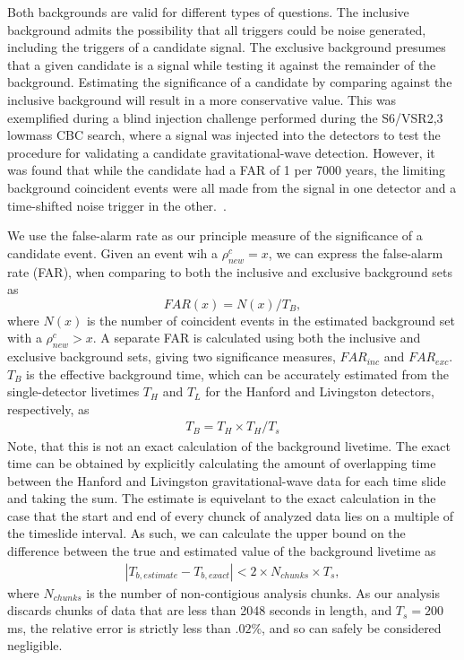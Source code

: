 Both backgrounds are valid for different types of questions. The inclusive background admits the possibility that all triggers could be noise generated, including the triggers of a candidate signal. The exclusive background presumes that a given candidate is a signal while testing it against the remainder of the background. Estimating the significance of a candidate by comparing against the inclusive background will result in a more conservative value. This was exemplified during a blind injection challenge performed during the S6/VSR2,3 lowmass CBC search, where a signal was injected into the detectors to test the procedure for validating a candidate gravitational-wave detection. However, it was found that while the candidate had a FAR of 1 per 7000 years, the limiting background coincident events were all made from the signal in one detector and a time-shifted noise trigger in the other.~\cite{Abadie:2011nz}.

We use the false-alarm rate as our principle measure of the significance of a candidate event. Given an event wih a $\rho^c_{new}=x$, we can express the false-alarm rate (FAR), when comparing to both the inclusive and exclusive background sets as
%
\begin{equation}
FAR (x) = N (x) / {T_B},
\end{equation}
%
where $N(x)$ is the number of coincident events in the estimated background set with a $\rho^c_{new} > x$. A separate FAR is calculated using both the inclusive and exclusive background sets, giving two significance measures, $FAR_{inc}$ and $FAR_{exc}$. $T_B$ is the effective background time, which can be accurately estimated from the single-detector livetimes $T_H$ and $T_L$ for the Hanford and Livingston detectors, respectively, as
%
\begin{eqnarray}
T_B =  T_H \times T_H / T_s
\end{eqnarray}
%
Note, that this is not an exact calculation of the background livetime. The exact time can be obtained by explicitly calculating the amount of overlapping time between the Hanford and Livingston gravitational-wave data for each time slide and taking the sum. The estimate is equivelant to the exact calculation in the case that the start and end of every chunck of analyzed data lies on a multiple of the timeslide interval. As such, we can calculate the upper bound on the difference between the true and estimated value of the background livetime as
%
\begin{eqnarray}
|T_{b, estimate} - T_{b, exact} |< 2 \times N_{chunks} \times T_s,
\end{eqnarray}
%
where $N_{chunks}$ is the number of non-contigious analysis chunks. As our analysis discards chunks of data that are less than 2048 seconds in length, and  $T_s=200$ ms, the relative error is strictly less than $.02\%$, and so can safely be considered negligible.

